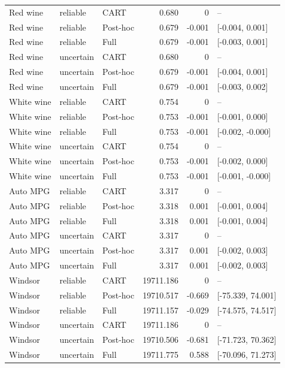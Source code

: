 \begin{tabular}{lllrrl}
Red wine & reliable & CART & 0.680 & 0 & -- \\
Red wine & reliable & Post-hoc & 0.679 & -0.001 & [-0.004, 0.001] \\
Red wine & reliable & Full & 0.679 & -0.001 & [-0.003, 0.001] \\
Red wine & uncertain & CART & 0.680 & 0 & -- \\
Red wine & uncertain & Post-hoc & 0.679 & -0.001 & [-0.004, 0.001] \\
Red wine & uncertain & Full & 0.679 & -0.001 & [-0.003, 0.002] \\
White wine & reliable & CART & 0.754 & 0 & -- \\
White wine & reliable & Post-hoc & 0.753 & -0.001 & [-0.001, 0.000] \\
White wine & reliable & Full & 0.753 & -0.001 & [-0.002, -0.000] \\
White wine & uncertain & CART & 0.754 & 0 & -- \\
White wine & uncertain & Post-hoc & 0.753 & -0.001 & [-0.002, 0.000] \\
White wine & uncertain & Full & 0.753 & -0.001 & [-0.001, -0.000] \\
Auto MPG & reliable & CART & 3.317 & 0 & -- \\
Auto MPG & reliable & Post-hoc & 3.318 & 0.001 & [-0.001, 0.004] \\
Auto MPG & reliable & Full & 3.318 & 0.001 & [-0.001, 0.004] \\
Auto MPG & uncertain & CART & 3.317 & 0 & -- \\
Auto MPG & uncertain & Post-hoc & 3.317 & 0.001 & [-0.002, 0.003] \\
Auto MPG & uncertain & Full & 3.317 & 0.001 & [-0.002, 0.003] \\
Windsor & reliable & CART & 19711.186 & 0 & -- \\
Windsor & reliable & Post-hoc & 19710.517 & -0.669 & [-75.339, 74.001] \\
Windsor & reliable & Full & 19711.157 & -0.029 & [-74.575, 74.517] \\
Windsor & uncertain & CART & 19711.186 & 0 & -- \\
Windsor & uncertain & Post-hoc & 19710.506 & -0.681 & [-71.723, 70.362] \\
Windsor & uncertain & Full & 19711.775 & 0.588 & [-70.096, 71.273] \\
\bottomrule
\end{tabular}
